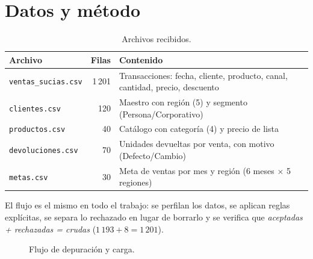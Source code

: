 \documentclass[11pt,letterpaper]{article}
\begin{document}
\section{Datos y método}

\begin{table}[H]
\centering
\caption{Archivos recibidos.}
\begin{tabularx}{\linewidth}{l r L}
\toprule
Archivo & Filas & Contenido \\
\midrule
\texttt{ventas\_sucias.csv} & 1\,201 & Transacciones: fecha, cliente, producto, canal, cantidad, precio, descuento \\
\texttt{clientes.csv} & 120 & Maestro con región (5) y segmento (Persona/Corporativo) \\
\texttt{productos.csv} & 40 & Catálogo con categoría (4) y precio de lista \\
\texttt{devoluciones.csv} & 70 & Unidades devueltas por venta, con motivo (Defecto/Cambio) \\
\texttt{metas.csv} & 30 & Meta de ventas por mes y región (6 meses $\times$ 5 regiones) \\
\bottomrule
\end{tabularx}
\end{table}

El flujo es el mismo en todo el trabajo: se perfilan los datos, se aplican reglas explícitas, se separa lo
rechazado en lugar de borrarlo y se verifica que \emph{aceptadas + rechazadas = crudas}
($1\,193 + 8 = 1\,201$).

\begin{figure}[H]
\centering
{}
\caption{Flujo de depuración y carga.}
\end{figure}
\end{document}
